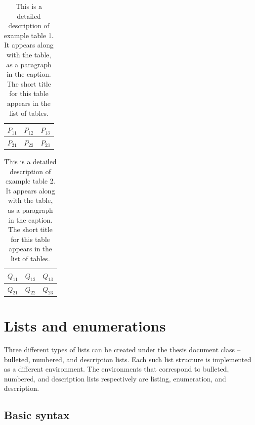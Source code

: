 \documentclass[twoside,openany]{thesis}
\begin{document}
\begin{table}[p]
    \begin{center}
        \begin{tabular}{|c|c|c|}
            \hline
            $P_{11}$ & $P_{12}$ & $P_{13}$\\
            \hline
            $P_{21}$ & $P_{22}$ & $P_{23}$\\
            \hline
        \end{tabular}
    \end{center}
    \caption[Short title for example table 1]{
        This is a detailed description of example table 1.
        It appears along with the table, as a paragraph in the caption.
        The short title for this table appears in the list of tables.
    }
    \label{tab:exampletable1}
\end{table}

\begin{table}[p]
    \begin{center}
        \begin{tabular}{|c|c|c|}
            \hline
            $Q_{11}$ & $Q_{12}$ & $Q_{13}$\\
            \hline
            $Q_{21}$ & $Q_{22}$ & $Q_{23}$\\
            \hline
        \end{tabular}
    \end{center}
    \caption[Short title for example table 2]{
        This is a detailed description of example table 2.
        It appears along with the table, as a paragraph in the caption.
        The short title for this table appears in the list of tables.
    }
    \label{tab:exampletable2}
\end{table}

\chapter{Lists and enumerations}\label{ch:Lists and enumerations}

Three different types of lists can be created under the {\ttfamily thesis} document class -- bulleted, numbered, and description lists.
Each such list structure is implemented as a different environment.
The environments that correspond to bulleted, numbered, and description lists respectively are {\ttfamily listing}, {\ttfamily enumeration}, and {\ttfamily description}.

\section{Basic syntax}\label{sec:Basic syntax}
\end{document}
